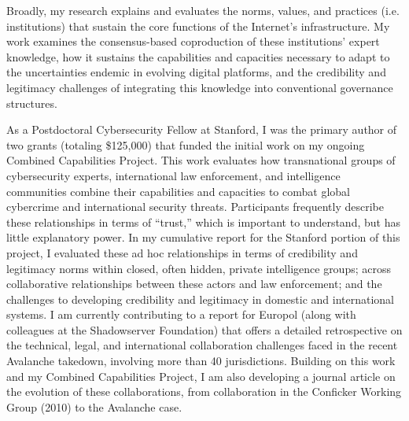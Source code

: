 \documentclass[11pt]{letter}
\begin{document}
\begin{letter}
%
Broadly, my research explains and
evaluates the norms, values, and practices (i.e. institutions) that
sustain the core functions of the Internet's infrastructure.
%
My work examines the consensus-based coproduction of these institutions' expert knowledge, how it sustains the capabilities and capacities necessary to adapt to the uncertainties endemic in evolving digital platforms, and the credibility and legitimacy challenges of integrating this knowledge into conventional governance structures. 
%

As a Postdoctoral Cybersecurity Fellow at Stanford, I was the primary author of two grants (totaling \$125,000) that funded the initial work on my ongoing Combined Capabilities Project.
%
This work evaluates how transnational groups of cybersecurity experts, international law enforcement, and intelligence communities combine their capabilities and capacities to combat global cybercrime and international security threats.
%
Participants frequently describe these relationships in terms of ``trust,'' which is important to understand, but has little explanatory power.
%
In my cumulative report for the Stanford portion of this project, I evaluated these ad hoc relationships in terms of credibility and legitimacy norms within closed, often hidden, private intelligence groups; across collaborative relationships between these actors and law enforcement; and the challenges to developing credibility and legitimacy in domestic and international systems.  
%
I am currently contributing to a report for Europol (along with colleagues at the Shadowserver Foundation) that offers a detailed retrospective on the technical, legal, and international collaboration challenges faced in the recent Avalanche takedown, involving more than 40 jurisdictions.
%
Building on this work and my Combined Capabilities Project, I am also developing a journal article on the evolution of these collaborations, from collaboration in the Conficker Working Group (2010) to the Avalanche case.


\end{letter}
\end{document}
